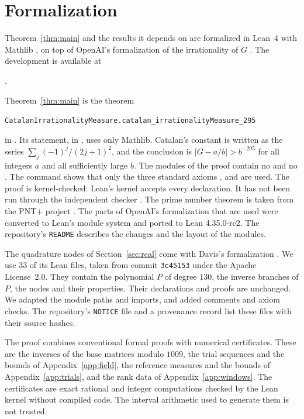 \section{Formalization}\label{sec:formal}

Theorem~\ref{thm:main} and the results it depends on are formalized in Lean~4 \cite{Lean4} with Mathlib \cite{Mathlib}, on top of OpenAI's
formalization of the irrationality of $G$ \cite{OpenAI2026}. The development is available at
\begin{center}
\FormalizationLink.
\end{center}
Theorem~\ref{thm:main} is the theorem
\begin{center}
{\small\texttt{CatalanIrrationalityMeasure.catalan\_irrationalityMeasure\_295}}
\end{center}
in . Its statement, in , uses only Mathlib. Catalan's constant is
written as the series $\sum_j(-1)^j/(2j+1)^2$, and the conclusion is $|G-a/b|>b^{-295}$ for all integers $a$
and all sufficiently large $b$. The modules of the proof contain no  and no . The command
 shows that only the three standard axioms ,  and
 are used. The proof is kernel-checked: Lean's kernel accepts every declaration. It has not been run through the independent checker  \cite{Comparator}.
The prime number theorem is taken from the PNT+ project \cite{PNTPlus}. The parts of
OpenAI's formalization that are used were converted to Lean's module system and ported to Lean
4.35.0-rc2. The repository's \texttt{README} describes the changes and the layout of the modules.

The quadrature nodes of Section~\ref{sec:real} come with Davis's formalization \cite{Davis2026}. We use 33
of its Lean files, taken from commit \texttt{3c45153} under the Apache License~2.0. They contain the
polynomial $P$ of degree $130$, the inverse branches of $P$, the nodes and their properties. Their
declarations and proofs are unchanged. We adapted the module paths and imports, and added comments and
axiom checks. The repository's \texttt{NOTICE} file and a provenance record list these files with their source
hashes.

The proof combines conventional formal proofs with numerical certificates. These are the inverses of the base
matrices modulo $1009$, the trial sequences and the bounds of Appendix~\ref{app:field}, the reference measures
and the bounds of Appendix~\ref{app:trials}, and the rank data of Appendix~\ref{app:windows}. The certificates are
exact rational and integer computations checked by the Lean kernel without compiled code. The interval
arithmetic used to generate them \cite{Arb} is not trusted.

